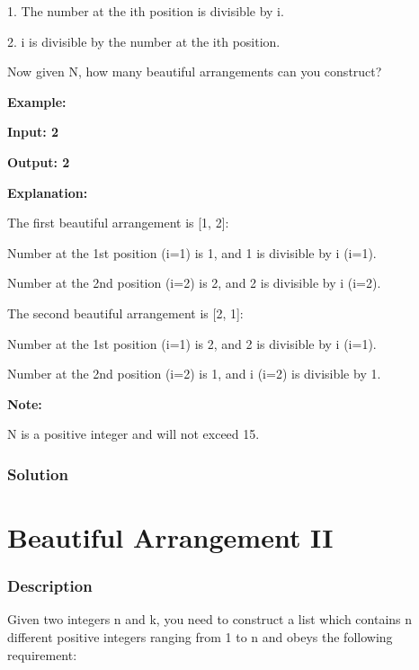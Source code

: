 1. The number at the ith position is divisible by i.

2. i is divisible by the number at the ith position.

Now given N, how many beautiful arrangements can you construct?

\textbf{Example:}

\textbf{Input: 2}

\textbf{Output: 2}

\textbf{Explanation:}

The first beautiful arrangement is [1, 2]:

Number at the 1st position (i=1) is 1, and 1 is divisible by i (i=1).

Number at the 2nd position (i=2) is 2, and 2 is divisible by i (i=2).

The second beautiful arrangement is [2, 1]:

Number at the 1st position (i=1) is 2, and 2 is divisible by i (i=1).

Number at the 2nd position (i=2) is 1, and i (i=2) is divisible by 1.

\textbf{Note:}

N is a positive integer and will not exceed 15.

\subsubsection{Solution}

\newpage

\section{Beautiful Arrangement II} %
\subsubsection{Description}
Given two integers n and k, you need to construct a list which contains n different positive integers ranging from 1 to n and obeys the following requirement:

